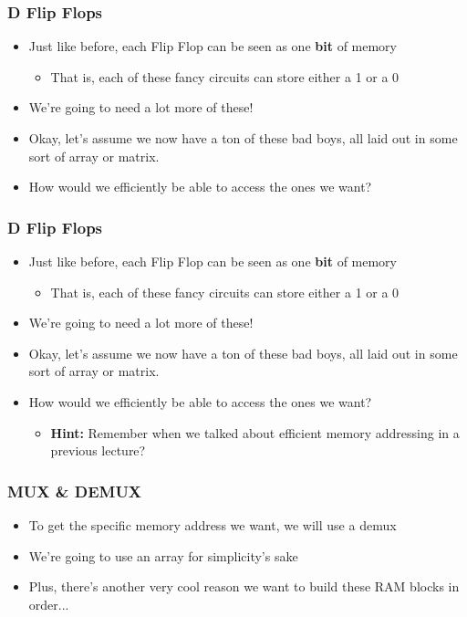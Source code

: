 \documentclass{beamer}
\begin{document}
        \begin{frame}
        		\frametitle{D Flip Flops}
        		\begin{itemize}
        			\item Just like before, each Flip Flop can be seen as one \textbf{bit} of memory
        			\begin{itemize}
        				\item That is, each of these fancy circuits can store either a 1 or a 0
        			\end{itemize}
        			\item We're going to need a lot more of these!
        			\item Okay, let's assume we now have a ton of these bad boys, all laid out in some sort of array or matrix.
        			\item How would we efficiently be able to access the ones we want?
        		\end{itemize}
        \end{frame}
        
        \begin{frame}
        		\frametitle{D Flip Flops}
        		\begin{itemize}
        			\item Just like before, each Flip Flop can be seen as one \textbf{bit} of memory
        			\begin{itemize}
        				\item That is, each of these fancy circuits can store either a 1 or a 0
        			\end{itemize}
        			\item We're going to need a lot more of these!
        			\item Okay, let's assume we now have a ton of these bad boys, all laid out in some sort of array or matrix.
        			\item How would we efficiently be able to access the ones we want?
        			\begin{itemize}
        				\item \textbf{Hint:} Remember when we talked about efficient memory addressing in a previous lecture?
        			\end{itemize}
        		\end{itemize}
        \end{frame}
        
        \begin{frame}
        		\frametitle{MUX \& DEMUX}
        		\begin{itemize}
        			\item To get the specific memory address we want, we will use a demux
        			\item We're going to use an array for simplicity's sake
        			\item Plus, there's another very cool reason we want to build these RAM blocks in order...
        			
        		\end{itemize}
        \end{frame}
        
\end{document}
